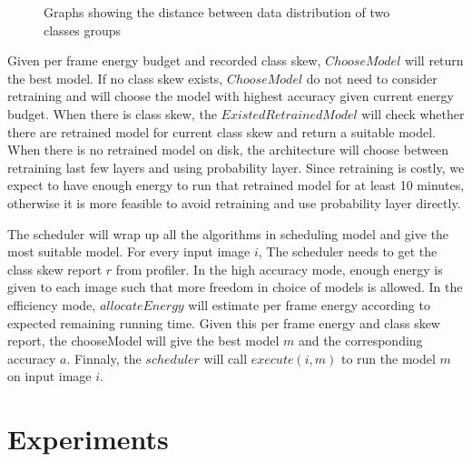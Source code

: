 \documentclass[conference]{IEEEtran}
\begin{document}
\begin{spacing}{0.9}
\begin{figure}
\caption{Graphs showing the distance between data distribution of two classes groups}
\label{fig:distributionDistance}
\end{figure}

Given per frame energy budget and recorded class skew, $ChooseModel$ will return the best model. If no class skew exists, $ChooseModel$ do not need to consider retraining and will choose the model with highest accuracy given current energy budget. When there is class skew, the $ExistedRetrainedModel$ will check whether there are retrained model for current class skew and return a suitable model. When there is no retrained model on disk, the architecture will choose between retraining last few layers and using probability layer. Since retraining is costly, we expect to have enough energy to run that retrained model for at least 10 minutes, otherwise it is more feasible to avoid retraining and use probability layer directly.


The scheduler will wrap up all the algorithms in scheduling model and give the most suitable model. For every input image $i$, The scheduler needs to get the class skew report $r$ from profiler. In the high accuracy mode, enough energy is given to each image such that more freedom in choice of models is allowed. In the efficiency mode, $allocateEnergy$ will estimate per frame energy according to expected remaining running time. Given this per frame energy and class skew report, the chooseModel will give the best model $m$ and the corresponding accuracy $a$. Finnaly, the $scheduler$ will call $execute(i,m)$ to run the model $m$ on input image $i$.


\section{Experiments}

\end{spacing}
\end{document}
